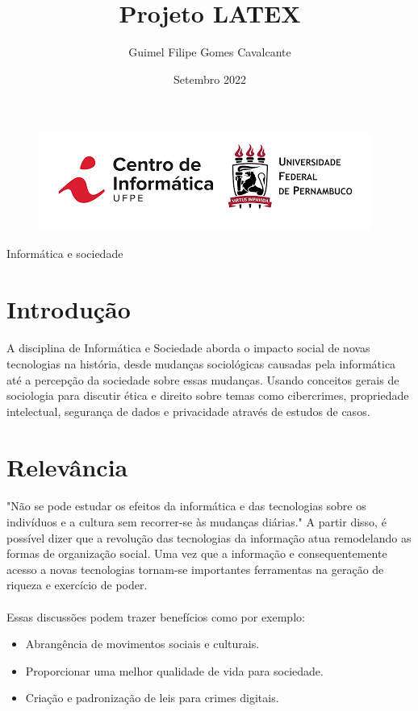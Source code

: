 \documentclass{article}
\title{Projeto LATEX}
\author{Guimel Filipe Gomes Cavalcante}
\date{Setembro 2022}
\begin{document}
\maketitle

\begin{figure} [h!]
    \centering
    \includegraphics[scale = 0.5]{cin.png}
\end{figure}
\begin{center}
    {\LARGE Informática e sociedade}
\end{center}


\section{Introdução}
\paragraph{} A disciplina de Informática e Sociedade aborda o impacto social de novas tecnologias na história, desde mudanças sociológicas causadas pela informática até a percepção da sociedade sobre essas mudanças. Usando conceitos gerais de sociologia para discutir ética e direito sobre temas como cibercrimes, propriedade intelectual, segurança de dados e privacidade através de estudos de casos.

\section{Relevância}
\paragraph{} "Não se pode estudar os efeitos da informática e das tecnologias sobre os indivíduos e a cultura sem recorrer-se às mudanças diárias." \citep{Manuel} A partir disso, é possível dizer que a revolução das tecnologias da informação atua remodelando as formas de organização social. Uma vez que a informação e consequentemente acesso a novas tecnologias tornam-se importantes ferramentas na geração de riqueza e exercício de poder.
\paragraph{} Essas discussões podem trazer benefícios como por exemplo:
\begin{itemize}
    \item Abrangência de movimentos sociais e culturais.
    \item Proporcionar uma melhor qualidade de vida para sociedade. 
    \item Criação e padronização de leis para crimes digitais.
    
\end{itemize}
\end{document}
